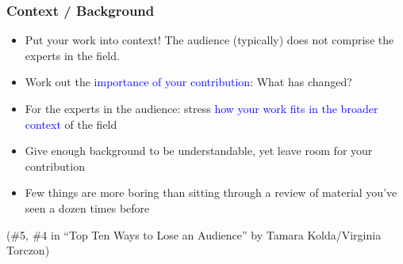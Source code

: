 \documentclass[aspectratio=43,10pt,ucs]{beamer} %
\begin{document}
\begin{frame}
  \frametitle{Context / Background}

  \begin{itemize}
  \item \alert{Put your work into context!} The audience (typically)
    does not comprise the experts in the field.
  \item Work out the \textcolor{blue}{importance of your
      contribution}: What has changed?
  \item For the experts in the audience: stress \textcolor{blue}{how
      your work fits in the broader context} of the field
  \item Give \alert{enough background to be understandable}, yet leave
    room for your contribution
  \item Few things are more boring than sitting through a review of
    material you've seen a dozen times before
  \end{itemize}

  \vspace*{1em}

  (\#5, \#4 in ``Top Ten Ways to Lose an Audience'' by Tamara
   Kolda/Virginia Torczon)

\end{frame}
\end{document}
